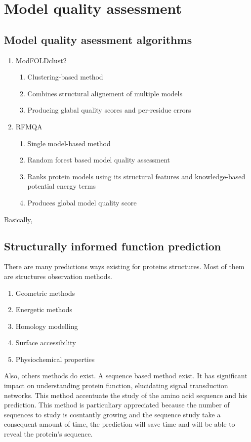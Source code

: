 \section{Model quality assessment}
\subsection{Model quality asessment algorithms}
\begin{enumerate}
	\item ModFOLDclust2
		\begin{enumerate}
		\item Clustering-based method
		\item Combines structural alignement of multiple models
		\item Producing glabal quality scores and per-residue errors
		\end{enumerate}
	\item RFMQA 
		\begin{enumerate}
		\item Single model-based method
		\item Random forest based model quality assessment
		\item Ranks protein models using its structural features and knowledge-based potential energy terms
		\item Produces global model quality score
		\end{enumerate}
\end{enumerate}

Basically, 

\subsection{Structurally informed function prediction}

There are many predictions ways existing for proteins structures. Most of them are structures observation methods.
\newline
\begin{enumerate}
\item Geometric methods
\item Energetic methods
\item Homology modelling
\item Surface accessibility
\item Physiochemical properties
\end{enumerate}
Also, others methods do exist. A sequence based method exist. It has significant impact on understanding protein function, elucidating signal transduction networks. This method accentuate the study of the amino acid sequence  and his prediction.
\newline 
This method is particuliary appreciated because the number of sequences to study is cosntantly growing and the sequence study take a consequent amount of time, the prediction will save time and will be able to reveal the protein's sequence.



